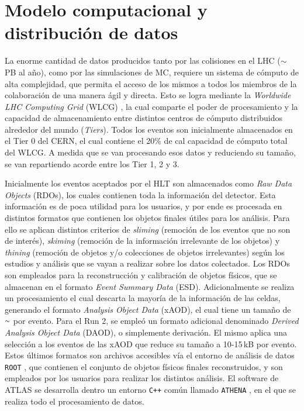 
\section{Modelo computacional y distribución de datos}\label{sec:lhc_samples}


La enorme cantidad de datos producidos tanto por las colisiones en el LHC ($\sim$\,PB al año), como por las simulaciones de MC, requiere un sistema de cómputo de alta complejidad, que permita el acceso de los mismos a todos los miembros de la colaboración de una manera ágil y directa. Esto se logra mediante la \textit{Worldwide LHC Computing Grid} (WLCG) \cite{grid}, la cual comparte el poder de procesamiento y la capacidad de almacenamiento entre distintos centros de cómputo distribuidos alrededor del mundo (\textit{Tiers}). Todos los eventos son inicialmente almacenados en el Tier 0 del CERN, el cual contiene el 20\% de cal capacidad de cómputo total del WLCG. A medida que se van procesando esos datos y reduciendo su tamaño, se van repartiendo acorde entre los Tier 1, 2 y 3.

Inicialmente los eventos aceptados por el HLT son almacenados como \textit{Raw Data Objects} (RDOs), los cuales contienen toda la información del detector. Esta información es de poca utilidad para los usuarios, y por ende es procesada en distintos formatos que contienen los objetos finales útiles para los análisis. Para ello se aplican distintos criterios de \textit{sliming} (remoción de los eventos que no son de interés), \textit{skiming} (remoción de la información irrelevante de los objetos) y \textit{thining} (remoción de objetos y/o colecciones de objetos irrelevantes) según los estudios y análisis que se vayan a realizar sobre los datos colectados. Los RDOs son empleados para la reconstrucción y calibración de objetos físicos, que se almacenan en el formato \textit{Event Summary Data} (ESD). Adicionalmente se realiza un procesamiento el cual descarta la mayoría de la información de las celdas, generando el formato \textit{Analysis Object Data} (xAOD), el cual tiene un tamaño de {$\smallsim$} por evento. Para el Run 2, se empleó un formato adicional denominado \textit{Derived Analysis Object Data} (DAOD), o simplemente derivación. El mismo aplica una selección a los eventos de las xAOD que reduce su tamaño a 10-15\,kB por evento. Estos últimos formatos son archivos accesibles vía el entorno de análisis de datos \texttt{ROOT} \cite{Brun:1997}, que contienen el conjunto de objetos físicos finales reconstruidos, y son empleados por los usuarios para realizar los distintos análisis.
El software de ATLAS se desarrolla dentro un entorno \texttt{C++} común llamado \texttt{ATHENA} \cite{ATLAS-TDR-17, analysistools, Calafiura:865624}, en el que se realiza todo el procesamiento de datos. 

